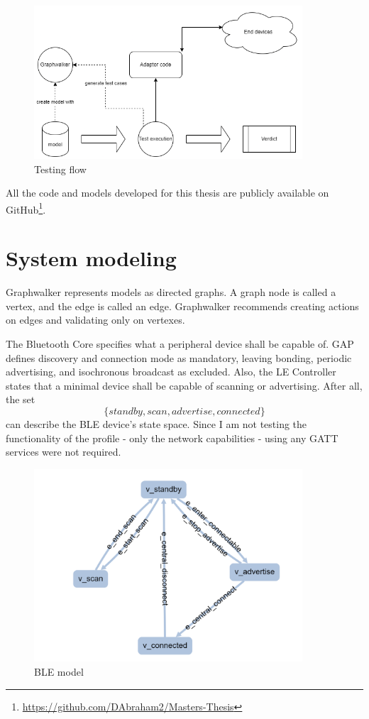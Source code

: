 \begin{figure}
    \centering
    \includegraphics[width=100mm, keepaspectratio]{figures/process_use_case.png}
    \caption{Testing flow}
    \label{fig:meth:test_flow}
\end{figure}

All the code and models developed for this thesis are publicly available on GitHub\footnote{\url{https://github.com/DAbraham2/Masters-Thesis}}.



\section{System modeling}
\label{sec:meth:sys_mod}

Graphwalker represents models as directed graphs. A graph node is called a vertex, and the edge is called an edge. Graphwalker recommends creating actions on edges and validating only on vertexes.

The Bluetooth Core specifies what a peripheral device shall be capable of. GAP defines discovery and connection mode as mandatory, leaving bonding, periodic advertising, and isochronous broadcast as excluded. Also, the LE Controller states that a minimal device shall be capable of scanning or advertising. After all, the set \[
    \{standby, scan, advertise, connected\}
\] can describe the BLE device's state space. Since I am not testing the functionality of the profile - only the network capabilities - using any GATT services were not required.

\begin{figure}
    \includegraphics[width=100mm, keepaspectratio]{figures/model_ble_final.png}
    \caption{BLE model}
\end{figure}

